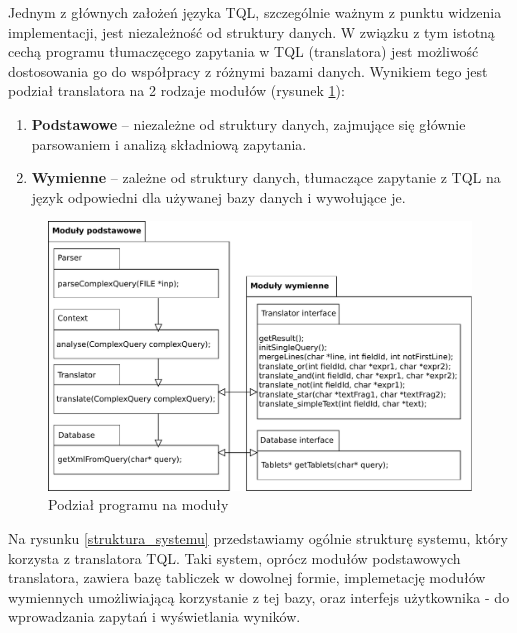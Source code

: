 

Jednym z głównych założeń języka TQL, szczególnie ważnym z punktu widzenia implementacji, jest niezależność od struktury danych.
W związku z tym istotną cechą programu tłumaczęcego zapytania w TQL (translatora) jest możliwość dostosowania  go do współpracy z różnymi bazami danych.
 Wynikiem tego jest podział translatora na 2 rodzaje modułów (rysunek \ref{moduly}):
\begin{enumerate}
 \item \textbf{Podstawowe} -- niezależne od struktury danych, zajmujące się głównie parsowaniem i analizą składniową zapytania.
 \item \textbf{Wymienne} -- zależne od struktury danych, tłumaczące zapytanie z TQL na język odpowiedni dla używanej bazy danych
i wywołujące je.
\end{enumerate}

\begin{figure}[h]
 \centering
 \includegraphics[width=450px]{../diagramy/pakiety.pdf}
 \caption{Podział programu na moduły}
 \label{moduly}
\end{figure}


Na rysunku \ref{struktura_systemu} przedstawiamy ogólnie strukturę systemu, który korzysta z translatora TQL. Taki system, oprócz modułów podstawowych translatora, zawiera bazę tabliczek w dowolnej formie, implemetację modułów wymiennych umożliwiającą korzystanie z tej bazy, oraz interfejs użytkownika - do wprowadzania zapytań i wyświetlania wyników. \\

